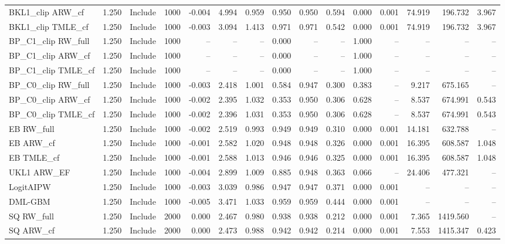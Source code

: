 \begin{tabular}{llllrrrrrrrrrrr}
BKL1\_clip ARW\_cf & 1.250 & Include & 1000 & -0.004 & 4.994 & 0.959 & 0.950 & 0.950 & 0.594 & 0.000 & 0.001 & 74.919 & 196.732 & 3.967 \\
BKL1\_clip TMLE\_cf & 1.250 & Include & 1000 & -0.003 & 3.094 & 1.413 & 0.971 & 0.971 & 0.542 & 0.000 & 0.001 & 74.919 & 196.732 & 3.967 \\
BP\_C1\_clip RW\_full & 1.250 & Include & 1000 & -- & -- & -- & 0.000 & -- & -- & 1.000 & -- & -- & -- & -- \\
BP\_C1\_clip ARW\_cf & 1.250 & Include & 1000 & -- & -- & -- & 0.000 & -- & -- & 1.000 & -- & -- & -- & -- \\
BP\_C1\_clip TMLE\_cf & 1.250 & Include & 1000 & -- & -- & -- & 0.000 & -- & -- & 1.000 & -- & -- & -- & -- \\
BP\_C0\_clip RW\_full & 1.250 & Include & 1000 & -0.003 & 2.418 & 1.001 & 0.584 & 0.947 & 0.300 & 0.383 & -- & 9.217 & 675.165 & -- \\
BP\_C0\_clip ARW\_cf & 1.250 & Include & 1000 & -0.002 & 2.395 & 1.032 & 0.353 & 0.950 & 0.306 & 0.628 & -- & 8.537 & 674.991 & 0.543 \\
BP\_C0\_clip TMLE\_cf & 1.250 & Include & 1000 & -0.002 & 2.396 & 1.031 & 0.353 & 0.950 & 0.306 & 0.628 & -- & 8.537 & 674.991 & 0.543 \\
EB RW\_full & 1.250 & Include & 1000 & -0.002 & 2.519 & 0.993 & 0.949 & 0.949 & 0.310 & 0.000 & 0.001 & 14.181 & 632.788 & -- \\
EB ARW\_cf & 1.250 & Include & 1000 & -0.001 & 2.582 & 1.020 & 0.948 & 0.948 & 0.326 & 0.000 & 0.001 & 16.395 & 608.587 & 1.048 \\
EB TMLE\_cf & 1.250 & Include & 1000 & -0.001 & 2.588 & 1.013 & 0.946 & 0.946 & 0.325 & 0.000 & 0.001 & 16.395 & 608.587 & 1.048 \\
UKL1 ARW\_EF & 1.250 & Include & 1000 & -0.004 & 2.899 & 1.009 & 0.885 & 0.948 & 0.363 & 0.066 & -- & 24.406 & 477.321 & -- \\
LogitAIPW & 1.250 & Include & 1000 & -0.003 & 3.039 & 0.986 & 0.947 & 0.947 & 0.371 & 0.000 & 0.001 & -- & -- & -- \\
DML-GBM & 1.250 & Include & 1000 & -0.005 & 3.471 & 1.033 & 0.959 & 0.959 & 0.444 & 0.000 & 0.001 & -- & -- & -- \\
SQ RW\_full & 1.250 & Include & 2000 & 0.000 & 2.467 & 0.980 & 0.938 & 0.938 & 0.212 & 0.000 & 0.001 & 7.365 & 1419.560 & -- \\
SQ ARW\_cf & 1.250 & Include & 2000 & 0.000 & 2.473 & 0.988 & 0.942 & 0.942 & 0.214 & 0.000 & 0.001 & 7.553 & 1415.347 & 0.423 \\

\end{tabular}
